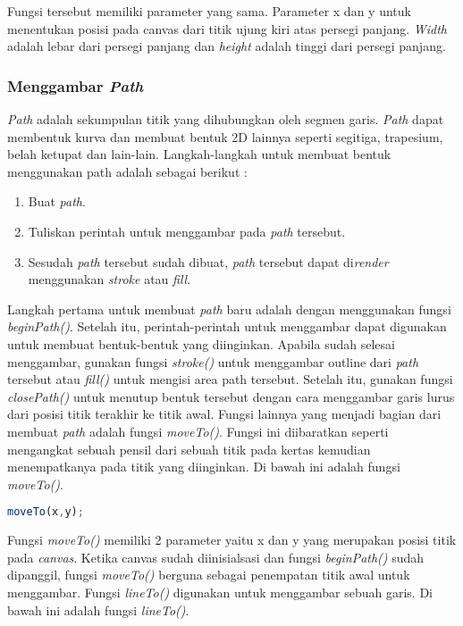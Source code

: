 Fungsi tersebut memiliki parameter yang sama. Parameter x dan y untuk menentukan posisi pada canvas dari titik ujung kiri atas persegi panjang. \textit{Width} adalah lebar dari persegi panjang dan \textit{height} adalah tinggi dari persegi panjang.

\subsubsection{Menggambar \textit{Path}}
\textit{Path} adalah sekumpulan titik yang dihubungkan oleh segmen garis. \textit{Path} dapat membentuk kurva dan membuat bentuk 2D lainnya seperti segitiga, trapesium, belah ketupat dan lain-lain. Langkah-langkah untuk membuat bentuk menggunakan path adalah sebagai berikut : 

\begin{enumerate}
	\item Buat \textit{path}.
	\item Tuliskan perintah untuk menggambar pada \textit{path} tersebut.
	\item Sesudah \textit{path} tersebut sudah dibuat, \textit{path} tersebut dapat di\textit{render} menggunakan \textit{stroke} atau \textit{fill}.
\end{enumerate}

Langkah pertama untuk membuat \textit{path} baru adalah dengan menggunakan fungsi \textit{beginPath()}. Setelah itu, perintah-perintah untuk menggambar dapat digunakan untuk membuat bentuk-bentuk yang diinginkan. Apabila sudah selesai menggambar, gunakan fungsi \textit{stroke()} untuk menggambar outline dari \textit{path} tersebut atau \textit{fill()} untuk mengisi area path tersebut. Setelah itu, gunakan fungsi \textit{closePath()} untuk menutup bentuk tersebut dengan cara menggambar garis lurus dari posisi titik terakhir ke titik awal. Fungsi lainnya yang menjadi bagian dari membuat \textit{path} adalah fungsi \textit{moveTo()}. Fungsi ini diibaratkan seperti mengangkat sebuah pensil dari sebuah titik pada kertas kemudian menempatkanya pada titik yang diinginkan. Di bawah ini adalah fungsi \textit{moveTo()}.

\begin{lstlisting}[language=Javascript, caption=Fungsi \textit{moveTo()}]
	moveTo(x,y);
\end{lstlisting}

Fungsi \textit{moveTo()} memiliki 2 parameter yaitu x dan y yang merupakan posisi titik pada \textit{canvas}. Ketika canvas sudah diinisialsasi dan fungsi \textit{beginPath()} sudah dipanggil, fungsi \textit{moveTo()} berguna sebagai penempatan titik awal untuk menggambar. Fungsi \textit{lineTo()} digunakan untuk menggambar sebuah garis. Di bawah ini adalah fungsi \textit{lineTo()}.

